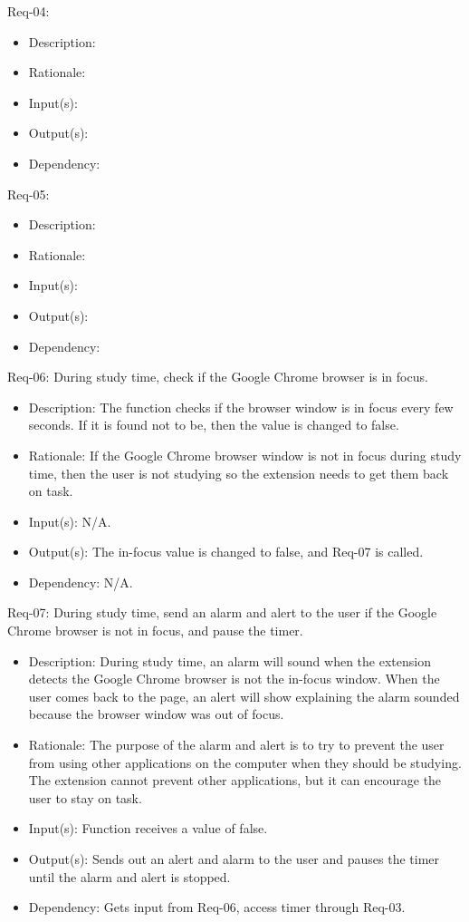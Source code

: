 \documentclass[12pt]{article}
\begin{document}
Req-04: 
\begin{itemize}
    \item Description: 
    \item Rationale: 
    \item Input(s): 
    \item Output(s): 
    \item Dependency: 
\end{itemize}
Req-05: 
\begin{itemize}
    \item Description: 
    \item Rationale: 
    \item Input(s): 
    \item Output(s): 
    \item Dependency: 
\end{itemize}
Req-06: During study time, check if the Google Chrome browser is in focus.
\begin{itemize}
    \item Description: The function checks if the browser window is in focus every few seconds. If it is found not to be, then the value is changed to false.
    \item Rationale: If the Google Chrome browser window is not in focus during study time, then the user is not studying so the extension needs to get them back on task.
    \item Input(s): N/A.
    \item Output(s): The in-focus value is changed to false, and Req-07 is called.
    \item Dependency: N/A.
\end{itemize}
Req-07: During study time, send an alarm and alert to the user if the Google Chrome browser is not in focus, and pause the timer. 
\begin{itemize}
    \item Description: During study time, an alarm will sound when the extension detects the Google Chrome browser is not the in-focus window. When the user comes back to the page, an alert will show explaining the alarm sounded because the browser window was out of focus.
    \item Rationale: The purpose of the alarm and alert is to try to prevent the user from using other applications on the computer when they should be studying. The extension cannot prevent other applications, but it can encourage the user to stay on task. 
    \item Input(s): Function receives a value of false.
    \item Output(s): Sends out an alert and alarm to the user and pauses the timer until the alarm and alert is stopped.
    \item Dependency: Gets input from Req-06, access timer through Req-03.
\end{itemize}
\end{document}
